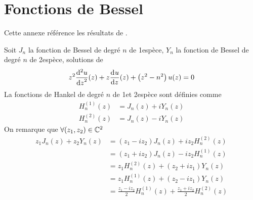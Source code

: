 \section{Fonctions de Bessel}

Cette annexe référence les résultats de \cite{abramowitz_handbook_1964}.

Soit \(J_n\) la fonction de Bessel de degré \(n\) de 1\iere espèce, \(Y_n\) la fonction de Bessel de degré \(n\) de 2\ieme espèce, solutions de
\begin{equation}
    z^2 \ddp[2]{z}{u}(z) + z\ddp{z}{u}(z)+\left(z^2-n^2\right)u(z) = 0
\end{equation}
La fonctions de Hankel de degré \(n\) de 1\iere et 2\ieme espèce sont définies comme
\begin{align}
    H_n^{(1)}(z) &= J_n(z) + iY_n(z)\\
    H_n^{(2)}(z) &= J_n(z) - iY_n(z)
\end{align}
On remarque que \(\forall (z_1,z_2) \in \CC^2\)
\begin{equation}
\begin{aligned}
z_1 J_n(z) + z_2 Y_n(z)
&= ( z_1 - i z_2 ) J_n(z) + iz_2 H_n^{(2)}(z) \\
&= ( z_1 + i z_2 ) J_n(z) - iz_2 H_n^{(1)}(z) \\
&= z_1 H_n^{(2)}(z) + ( z_2 + i z_1 ) Y_n(z) \\
&= z_1 H_n^{(1)}(z) + ( z_2 - i z_1 ) Y_n(z) \\
&= \frac{z_1-iz_2}{2}H_n^{(1)}(z) + \frac{z_1+iz_2}{2}H_n^{(2)}(z)
\end{aligned}
\label{eq:annex:bessel:equiv_bessel}
\end{equation}